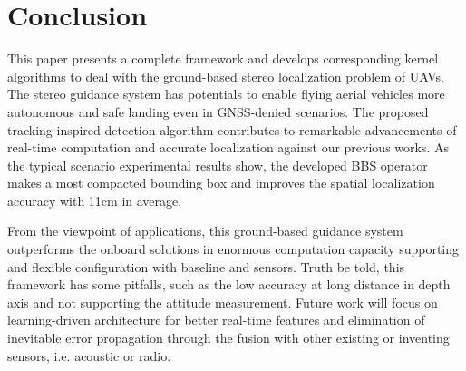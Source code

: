 



\section{Conclusion}
This paper presents a complete framework and develops corresponding kernel algorithms to deal with the ground-based stereo localization problem of UAVs. The stereo guidance system has potentials to enable flying aerial vehicles more autonomous and safe landing even in GNSS-denied scenarios. The proposed tracking-inspired detection algorithm contributes to remarkable advancements of real-time computation and accurate localization against our previous works. As the typical scenario experimental results show, the developed BBS operator makes a most compacted bounding box and improves the spatial localization accuracy with 11cm in average. 

From the viewpoint of applications, this ground-based guidance system outperforms the onboard solutions in enormous computation capacity supporting and flexible configuration with baseline and sensors. Truth be told, this framework has some pitfalls, such as the low accuracy at long distance in depth axis and not supporting the attitude measurement. Future work will focus on learning-driven architecture for better real-time features and elimination of inevitable error propagation through the fusion with other existing or inventing sensors, i.e. acoustic or radio.


